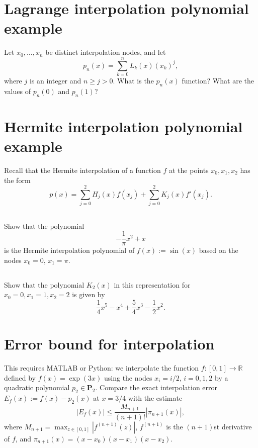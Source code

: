 \documentclass[11pt,letterpaper]{article}
\begin{document}
\section{Lagrange interpolation polynomial example}
Let $x_0,\ldots, x_n$ be distinct interpolation nodes, and let
  $$
  p_n(x) = \sum^n_{k=0}L_{k}(x)(x_k)^j,
  $$
where $j$ is an integer and $n \geq j>0$. What is the $p_n(x)$ function? What are the values of $p_n(0)$ and $p_n(1)$?

\section{Hermite interpolation polynomial example}
Recall that the Hermite interpolation of a function $f$ at the points $x_0,x_1,x_2$ has the form 
$$p(x) = \sum_{j=0}^2H_j(x)f(x_j)
+ \sum_{j=0}^2K_j(x)f'(x_j).$$ 
  
\subsection{}
Show that the polynomial
$$ -\frac{1}{\pi}x^2 + x$$ 
is the Hermite interpolation polynomial of $f(x):=\sin(x)$ based on the nodes $x_0=0$, $x_1=\pi$.
  
\subsection{}
Show that the polynomial $K_2(x)$ in
this representation for $x_0=0,x_1=1,x_2=2$ is given by
$$
\frac{1}{4}x^5 - x^4 + \frac{5}{4}x^3 - \frac{1}{2}x^2.
$$

\section{Error bound for interpolation}
This requires MATLAB or Python: we interpolate the function $f:[0,1]\to\mathbb R$ defined by
  $f(x) = \exp(3x)$ using the nodes $x_i=i/2$, $i=0,1,2$ by a
  quadratic polynomial $p_2\in \boldsymbol P_2$.
 Compare the exact interpolation error $E_f(x):=f(x)-p_2(x)$ at
 $x=3/4$ with the estimate
  \begin{equation*}
  |E_f(x)|\le \frac{M_{n+1}}{(n+1)!}|\pi_{n+1}(x)|,
  \end{equation*}
  where $M_{n+1} = \max_{z\in [0,1]}|f^{(n+1)}(z)|$, $f^{(n+1)}$ is
  the $(n+1)$st derivative of $f$, and
  $\pi_{n+1}(x)=(x-x_0)(x-x_1)(x-x_2)$.

\vfill
\printbibliography
\end{document}
